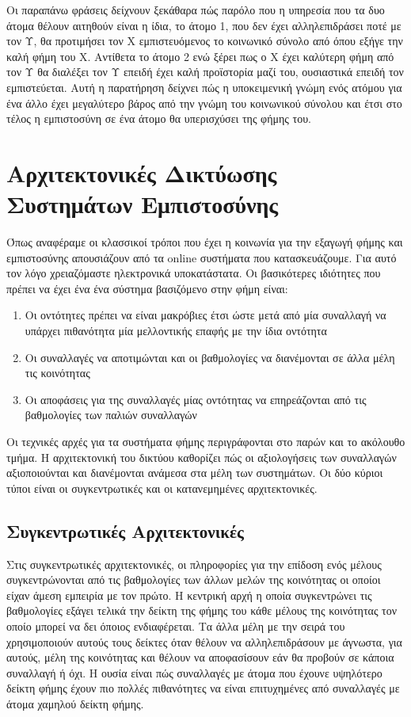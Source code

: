 Οι παραπάνω φράσεις δείχνουν ξεκάθαρα πώς παρόλο που η υπηρεσία που τα δυο άτομα θέλουν αιτηθούν είναι η ίδια, το άτομο 1, που δεν έχει αλληλεπιδράσει ποτέ με τον Υ, θα προτιμήσει τον Χ εμπιστευόμενος το κοινωνικό σύνολο από όπου εξήγε την καλή φήμη του Χ. Αντίθετα το άτομο 2 ενώ ξέρει πως ο Χ έχει καλύτερη φήμη από τον Υ θα διαλέξει τον Υ επειδή έχει καλή προϊστορία μαζί του, ουσιαστικά επειδή τον εμπιστεύεται. Αυτή η παρατήρηση δείχνει πώς η υποκειμενική γνώμη ενός ατόμου για ένα άλλο έχει μεγαλύτερο βάρος από την γνώμη του κοινωνικού σύνολου και έτσι στο τέλος η εμπιστοσύνη σε ένα άτομο θα υπερισχύσει της φήμης του.

\section{Αρχιτεκτονικές Δικτύωσης Συστημάτων Εμπιστοσύνης}

Όπως αναφέραμε οι κλασσικοί τρόποι που έχει η κοινωνία για την εξαγωγή φήμης και εμπιστοσύνης απουσιάζουν από τα online συστήματα που κατασκευάζουμε. Για αυτό τον λόγο χρειαζόμαστε ηλεκτρονικά υποκατάστατα. Οι βασικότερες ιδιότητες που πρέπει να έχει ένα ένα σύστημα βασιζόμενο στην φήμη είναι: \cite{Resnick} 

\begin{enumerate}
\item Οι οντότητες πρέπει να είναι μακρόβιες έτσι ώστε μετά από μία συναλλαγή να υπάρχει πιθανότητα μία μελλοντικής επαφής με την ίδια οντότητα

\item Οι συναλλαγές να αποτιμώνται και οι βαθμολογίες να διανέμονται σε άλλα μέλη τις κοινότητας

\item Οι αποφάσεις για της συναλλαγές μίας οντότητας να επηρεάζονται από τις βαθμολογίες των παλιών συναλλαγών
\end{enumerate}

Οι τεχνικές αρχές για τα συστήματα φήμης περιγράφονται στο παρών και το ακόλουθο τμήμα. Η αρχιτεκτονική του δικτύου καθορίζει πώς οι αξιολογήσεις των συναλλαγών αξιοποιούνται και διανέμονται ανάμεσα στα μέλη των συστημάτων. Οι δύο κύριοι τύποι είναι οι συγκεντρωτικές και οι κατανεμημένες αρχιτεκτονικές.\cite{Josang}
\subsection{Συγκεντρωτικές Αρχιτεκτονικές}\label{sec:centralized}

Στις συγκεντρωτικές αρχιτεκτονικές, οι πληροφορίες για την επίδοση ενός μέλους συγκεντρώνονται από τις βαθμολογίες των άλλων μελών της κοινότητας οι οποίοι είχαν άμεση εμπειρία με τον πρώτο. Η κεντρική αρχή η οποία συγκεντρώνει τις βαθμολογίες εξάγει τελικά την δείκτη της φήμης του κάθε μέλους της κοινότητας τον οποίο μπορεί να δει όποιος ενδιαφέρεται. Τα άλλα μέλη με την σειρά του χρησιμοποιούν αυτούς τους δείκτες όταν θέλουν να αλληλεπιδράσουν με άγνωστα, για αυτούς, μέλη της κοινότητας και θέλουν να αποφασίσουν εάν θα προβούν σε κάποια συναλλαγή ή όχι. Η ουσία είναι πώς συναλλαγές με άτομα που έχουνε υψηλότερο δείκτη φήμης έχουν πιο πολλές πιθανότητες να είναι επιτυχημένες από συναλλαγές με άτομα χαμηλού δείκτη φήμης.


